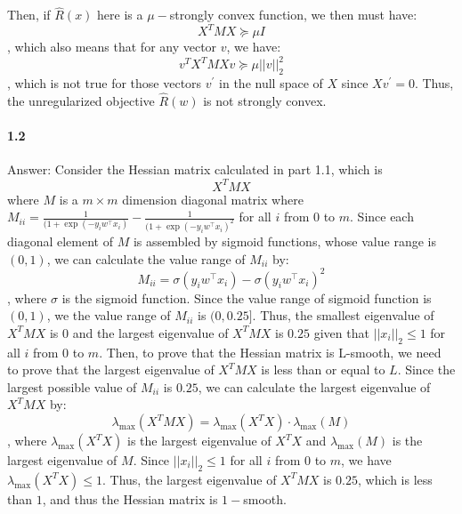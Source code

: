 \documentclass[11pt]{article}
\begin{document}
Then, if $\hat{R}(x)$ here is a $\mu-$strongly convex function, we then must have:
\begin{equation}
    X^TMX\succeq \mu I
\end{equation}
, which also means that for any vector $v$, we have:
\begin{equation}
    v^TX^TMXv \succeq \mu ||v||^2_2
\end{equation}
, which is not true for those vectors $v^\prime$ in the null space of $X$ since $Xv^\prime =0$.
Thus, the unregularized objective $\hat{R}(w)$ is not strongly convex.

\paragraph{1.2}
Answer:
\newline
Consider the Hessian matrix calculated in part 1.1, which is 
\begin{equation}
    X^TMX
\end{equation}
where $M$ is a $m\times m$ dimension diagonal matrix where $M_{ii} = \frac{1}{(1+\exp{(-y_iw^\top x_i)}}-\frac{1}{(1+\exp{(-y_iw^\top x_i)^2}}$ for all $i$ from 0 to $m$.
Since each diagonal element of $M$ is assembled by sigmoid functions, whose value range is $(0,1)$, we can calculate the value range of $M_{ii}$ by:
\begin{equation}
    M_{ii} = \sigma(y_iw^\top x_i) - \sigma(y_iw^\top x_i)^2
\end{equation}
, where $\sigma$ is the sigmoid function. Since the value range of sigmoid function is $(0,1)$, we the value range of $M_{ii}$ is $(0,0.25]$.
Thus, the smallest eigenvalue of $X^TMX$ is $0$ and the largest eigenvalue of $X^TMX$ is $0.25$ given that $||x_i||_2 \leq 1$ for all $i$ from 0 to $m$.
Then, to prove that the Hessian matrix is L-smooth, we need to prove that the largest eigenvalue of $X^TMX$ is less than or equal to $L$. Since the largest possible value of $M_{ii}$ is $0.25$, we can calculate the largest eigenvalue of $X^TMX$ by:
\begin{equation}
    \lambda_{\max}(X^TMX) = \lambda_{\max}(X^TX)\cdot\lambda_{\max}(M)
\end{equation}
, where $\lambda_{\max}(X^TX)$ is the largest eigenvalue of $X^TX$ and $\lambda_{\max}(M)$ is the largest eigenvalue of $M$.
Since $||x_i||_2 \leq 1$ for all $i$ from 0 to $m$, we have $\lambda_{\max}(X^TX) \leq 1$.
Thus, the largest eigenvalue of $X^TMX$ is $0.25$, which is less than $1$, and thus the Hessian matrix is $1-$smooth.
\end{document}
